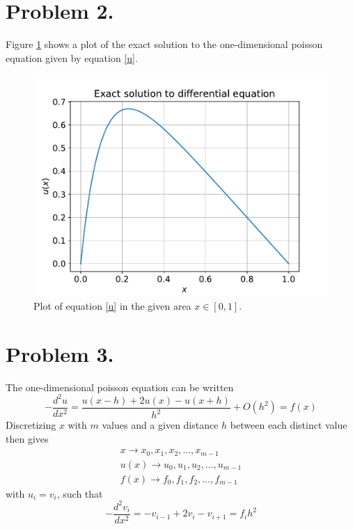 \documentclass[english,notitlepage]{revtex4-1}  %
\begin{document}
\section*{Problem 2.}
    \label{sec:oppgave2}
    Figure \ref{exact_plot} shows a plot of the exact solution to the one-dimensional poisson equation given by equation \ref{u}.
    \begin{figure}[!ht]
        \centering
        \includegraphics[scale=0.7]{exact_solution.pdf}
        \caption{Plot of equation \ref{u} in the given area $x \in [0, 1]$.}
        \label{exact_plot}
    \end{figure}


\section*{Problem 3.}
    The one-dimensional poisson equation can be written
    \begin{equation*}
            -\frac{d ^2 u}{dx^2} 
        =   \frac{u(x-h)+2u(x)- u(x+h)}{h^2} + O(h^2)
        =   f(x)
    \end{equation*}
    Discretizing $x$ with $m$ values and a given distance $h$ between each distinct value then gives
    \begin{align*}
            x 
        \rightarrow 
            x_0, x_1, x_2, ..., x_{m - 1}\\
            u(x) 
        \rightarrow 
            u_0, u_1, u_2, ..., u_{m - 1}\\
            f(x) 
        \rightarrow 
            f_0, f_1 , f_2, ..., f_{m - 1}
    \end{align*}
    with $u_i = v_i$, such that
    \begin{equation*}
            -\frac{d^2 v_i}{dx^2} 
        =   -v_{i-1} + 2v_i - v_{i+1} 
        =   f_ih^2
    \end{equation*}
\end{document}
